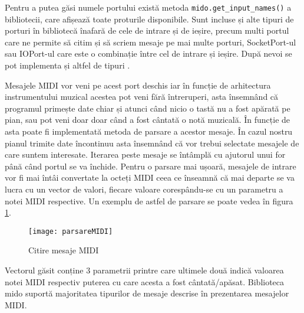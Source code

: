 \documentclass[../IoMusT.tex]{subfiles}
\begin{document}
 Pentru a putea găsi numele portului există metoda \verb|mido.get_input_names()| a bibliotecii, care afișează toate proturile disponibile. Sunt incluse și alte tipuri de porturi în bibliotecă înafară de cele de intrare și de ieșire, precum multi portul care ne permite să citim și să scriem mesaje pe mai multe porturi, SocketPort-ul sau IOPort-ul care este o combinație între cel de intrare și ieșire. După nevoi se pot implementa și altfel de tipuri \cite{Mido}.
\\
\par Mesajele MIDI vor veni pe acest port deschis iar în funcție de arhitectura instrumentului muzical acestea pot veni fără întreruperi, asta însemnând că programul primește date chiar și atunci când nicio o tastă nu a fost apărată pe pian, sau pot veni doar doar când a fost cântată o notă muzicală. În funcție de asta poate fi implementată metoda de parsare a acestor mesaje. În cazul nostru pianul trimite date încontinuu asta însemnând că vor trebui selectate mesajele de care suntem interesate. Iterarea peste mesaje se întâmplă cu ajutorul unui for până când portul se va închide. Pentru o parsare mai ușoară, mesajele de intrare vor fi mai întâi convertate la octeți MIDI ceea ce înseamnă că mai departe se va lucra cu un vector de valori, fiecare valoare corespându-se cu un parametru a notei MIDI respective. Un exemplu de astfel de parsare se poate vedea în figura \ref{fig:midiPars}. 
\begin{figure}[h]
\centering
\texttt{[image: parsareMIDI]}
\caption{Citire mesaje MIDI}
\label{fig:midiPars}
\end{figure}
Vectorul găsit conține 3 parametrii printre care ultimele două indică valoarea notei MIDI respectiv puterea cu care acesta a fost cântată/apăsat. Biblioteca mido suportă majoritatea tipurilor de mesaje descrise în prezentarea mesajelor MIDI. 
\end{document}
